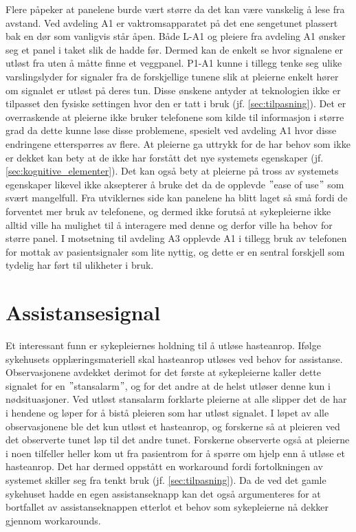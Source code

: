 \noindent
Flere påpeker at panelene burde vært større da det kan være vanskelig å lese fra avstand. Ved avdeling A1 er vaktromsapparatet på det ene sengetunet plassert bak en dør som vanligvis står åpen. Både L-A1 og pleiere fra avdeling A1 ønsker seg et panel i taket slik de hadde før. Dermed kan de enkelt se hvor signalene er utløst fra uten å måtte finne et veggpanel. P1-A1 kunne i tillegg tenke seg ulike varslingslyder for signaler fra de forskjellige tunene slik at pleierne enkelt hører om signalet er utløst på deres tun. Disse ønskene antyder at teknologien ikke er tilpasset den fysiske settingen hvor den er tatt i bruk (jf. \ref{sec:tilpasning}). Det er overraskende at pleierne ikke bruker telefonene som kilde til informasjon i større grad da dette kunne løse disse problemene, spesielt ved avdeling A1 hvor disse endringene etterspørres av flere. At pleierne ga uttrykk for de har behov som ikke er dekket kan bety at de ikke har forstått det nye systemets egenskaper (jf. \ref{sec:kognitive_elementer}). Det kan også bety at pleierne på tross av systemets egenskaper likevel ikke aksepterer å bruke det da de opplevde $"$ease of use$"$ som svært mangelfull. Fra utviklernes side kan panelene ha blitt laget så små fordi de forventet mer bruk av telefonene, og dermed ikke forutså at sykepleierne ikke alltid ville ha mulighet til å interagere med denne og derfor ville ha behov for større panel. I motsetning til avdeling A3 opplevde  A1 i tillegg bruk av telefonen for mottak av pasientsignaler som lite nyttig, og dette er en sentral forskjell som tydelig har ført til ulikheter i bruk.

\section{Assistansesignal}
Et interessant funn er sykepleiernes holdning til å utløse hasteanrop. Ifølge sykehusets opplæringsmateriell skal hasteanrop utløses ved behov for assistanse. Observasjonene avdekket derimot for det første at sykepleierne kaller dette signalet for en $"$stansalarm$"$, og for det andre at de helst utløser denne kun i nødsituasjoner. Ved utløst stansalarm forklarte pleierne at alle slipper det de har i hendene og løper for å bistå pleieren som har utløst signalet. I løpet av alle observasjonene ble det kun utløst et hasteanrop, og forskerne så at pleieren ved det observerte tunet løp til det andre tunet. Forskerne observerte også at pleierne i noen tilfeller heller kom ut fra pasientrom for å spørre om hjelp enn å utløse et hasteanrop. Det har dermed oppstått en workaround fordi fortolkningen av systemet skiller seg fra tenkt bruk (jf. \ref{sec:tilpasning}). Da de ved det gamle sykehuset hadde en egen assistanseknapp kan det også argumenteres for at bortfallet av assistanseknappen etterlot et behov som sykepleierne nå dekker gjennom workarounds. 

